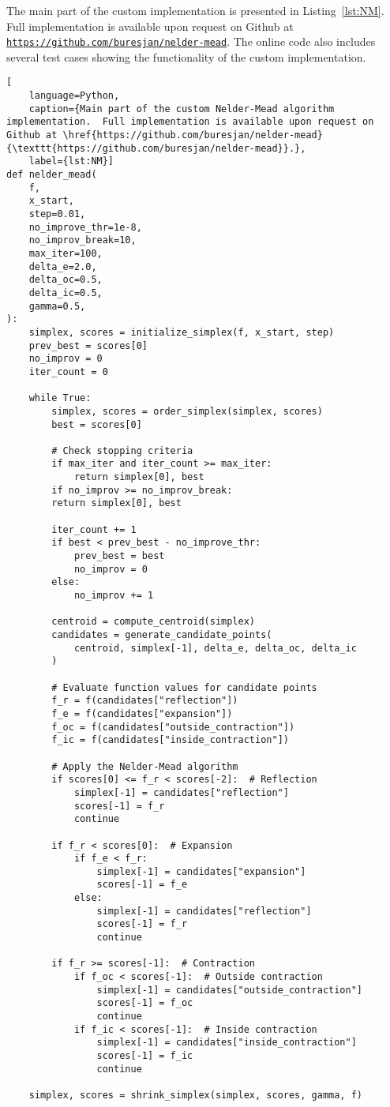 The main part of the custom implementation is presented in Listing~\ref{lst:NM}. Full implementation is available upon request on Github at \href{https://github.com/buresjan/nelder-mead}{\texttt{https://github.com/buresjan/nelder-mead}}. The online code also includes several test cases showing the functionality of the custom implementation.

\newpage
\begin{lstlisting}[
	language=Python,
	caption={Main part of the custom Nelder-Mead algorithm implementation.  Full implementation is available upon request on Github at \href{https://github.com/buresjan/nelder-mead}{\texttt{https://github.com/buresjan/nelder-mead}}.},
	label={lst:NM}]
def nelder_mead(
	f,
	x_start,
	step=0.01,
	no_improve_thr=1e-8,
	no_improv_break=10,
	max_iter=100,
	delta_e=2.0,
	delta_oc=0.5,
	delta_ic=0.5,
	gamma=0.5,
):
	simplex, scores = initialize_simplex(f, x_start, step)
	prev_best = scores[0]
	no_improv = 0
	iter_count = 0
	
	while True:
		simplex, scores = order_simplex(simplex, scores)
		best = scores[0]
		
		# Check stopping criteria
		if max_iter and iter_count >= max_iter:
			return simplex[0], best
		if no_improv >= no_improv_break:
		return simplex[0], best
		
		iter_count += 1
		if best < prev_best - no_improve_thr:
			prev_best = best
			no_improv = 0
		else:
			no_improv += 1
		
		centroid = compute_centroid(simplex)
		candidates = generate_candidate_points(
			centroid, simplex[-1], delta_e, delta_oc, delta_ic
		)
		
		# Evaluate function values for candidate points
		f_r = f(candidates["reflection"])
		f_e = f(candidates["expansion"])
		f_oc = f(candidates["outside_contraction"])
		f_ic = f(candidates["inside_contraction"])
		
		# Apply the Nelder-Mead algorithm
		if scores[0] <= f_r < scores[-2]:  # Reflection
			simplex[-1] = candidates["reflection"]
			scores[-1] = f_r
			continue
		
		if f_r < scores[0]:  # Expansion
			if f_e < f_r:
				simplex[-1] = candidates["expansion"]
				scores[-1] = f_e
			else:
				simplex[-1] = candidates["reflection"]
				scores[-1] = f_r
				continue
		
		if f_r >= scores[-1]:  # Contraction
			if f_oc < scores[-1]:  # Outside contraction
				simplex[-1] = candidates["outside_contraction"]
				scores[-1] = f_oc
				continue
			if f_ic < scores[-1]:  # Inside contraction
				simplex[-1] = candidates["inside_contraction"]
				scores[-1] = f_ic
				continue
		
	simplex, scores = shrink_simplex(simplex, scores, gamma, f)
\end{lstlisting}


